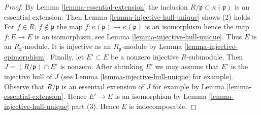 \documentclass[10pt,a4paper]{amsart}
\theoremstyle{plain}
\theoremstyle{definition}
\theoremstyle{remark}
\numberwithin{equation}{subsection}
\begin{document}
\begin{proof}
By Lemma \ref{lemma-essential-extension} the inclusion
$R/\mathfrak p \subset \kappa(\mathfrak p)$ is an essential
extension. Then Lemma \ref{lemma-injective-hull-unique}
shows (2) holds. For $f \in R$, $f \not \in \mathfrak p$
the map $f : \kappa(\mathfrak p) \to \kappa(\mathfrak p)$ is an isomorphism
hence the map $f : E \to E$ is an isomorphism,
see Lemma \ref{lemma-injective-hull-unique}.
Thus $E$ is an $R_\mathfrak p$-module. It is injective
as an $R_\mathfrak p$-module by Lemma \ref{lemma-injective-epimorphism}.
Finally, let $E' \subset E$ be a nonzero injective $R$-submodule.
Then $J = (R/\mathfrak p) \cap E'$ is nonzero. After shrinking $E'$
we may assume that $E'$ is the injective hull of $J$ (see
Lemma \ref{lemma-injective-hull-unique} for example).
Observe that $R/\mathfrak p$ is an essential extension of $J$ for example by
Lemma \ref{lemma-essential-extension}. Hence $E' \to E$
is an isomorphism by Lemma \ref{lemma-injective-hull-unique} part (3).
Hence $E$ is indecomposable.
\end{proof}
\end{document}

